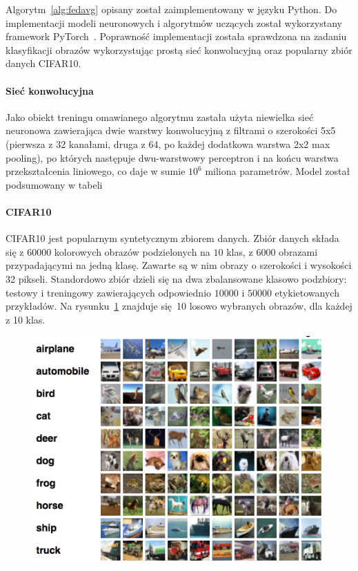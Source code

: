   Algorytm~\ref{alg:fedavg} opisany został zaimplementowany w języku Python. Do implementacji modeli
  neuronowych i algorytmów uczących został wykorzystany framework
  PyTorch~\cite{paszke2017automatic}. Poprawność implementacji została sprawdzona na zadaniu klasyfikacji obrazów wykorzystując prostą sieć konwolucyjną oraz popularny zbiór danych CIFAR10. 

  \paragraph{Sieć konwolucyjna}

  Jako obiekt treningu omawianego algorytmu zastała użyta niewielka sieć neuronowa zawierająca
  dwie warstwy konwolucyjną z filtrami o szerokości 5x5 (pierwsza z 32 kanałami, druga z 64, po
  każdej dodatkowa warstwa 2x2 max pooling), po których następuje dwu-warstwowy perceptron i na
  końcu warstwa przekształcenia liniowego, co daje w sumie \(10^6\) miliona parametrów. Model został podsumowany w tabeli 


  \paragraph{CIFAR10}

  CIFAR10 jest popularnym syntetycznym zbiorem danych. Zbiór danych składa się z \(\num{60000}\)
  kolorowych obrazów podzielonych na \(\num{10}\) klas, z \(\num{6000}\) obrazami przypadającymi
  na jedną klasę. Zawarte są w nim obrazy o szerokości i wysokości 32 pikseli. Standordowo zbiór
  dzieli się na dwa zbalansowane klasowo podzbiory: testowy i treningowy zawierających odpowiednio
  \(10000\) i \(50000\) etykietowanych przykładów. Na rysunku~\ref{fig:cifar10_example} znajduje się 10 losowo wybranych obrazów, dla każdej z 10 klas.

  \begin{figure}[t]
    \centering
    \includegraphics[width=1.0\textwidth]{img/cifar10_example.png}
    \label{fig:cifar10_example}
  \end{figure}

